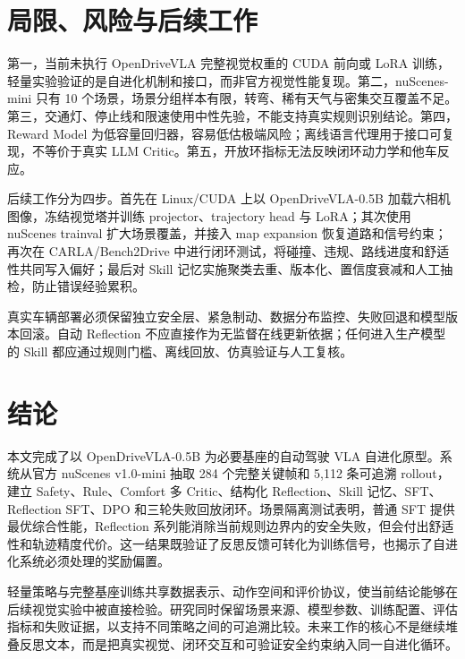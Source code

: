 \documentclass[UTF8,a4paper,12pt,fontset=fandol]{ctexart}
\begin{document}
\section{局限、风险与后续工作}
第一，当前未执行 OpenDriveVLA 完整视觉权重的 CUDA 前向或 LoRA 训练，轻量实验验证的是自进化机制和接口，而非官方视觉性能复现。第二，nuScenes-mini 只有 10 个场景，场景分组样本有限，转弯、稀有天气与密集交互覆盖不足。第三，交通灯、停止线和限速使用中性先验，不能支持真实规则识别结论。第四，Reward Model 为低容量回归器，容易低估极端风险；离线语言代理用于接口可复现，不等价于真实 LLM Critic。第五，开放环指标无法反映闭环动力学和他车反应。

后续工作分为四步。首先在 Linux/CUDA 上以 OpenDriveVLA-0.5B 加载六相机图像，冻结视觉塔并训练 projector、trajectory head 与 LoRA；其次使用 nuScenes trainval 扩大场景覆盖，并接入 map expansion 恢复道路和信号约束；再次在 CARLA/Bench2Drive 中进行闭环测试，将碰撞、违规、路线进度和舒适性共同写入偏好；最后对 Skill 记忆实施聚类去重、版本化、置信度衰减和人工抽检，防止错误经验累积。

真实车辆部署必须保留独立安全层、紧急制动、数据分布监控、失败回退和模型版本回滚。自动 Reflection 不应直接作为无监督在线更新依据；任何进入生产模型的 Skill 都应通过规则门槛、离线回放、仿真验证与人工复核。

\section{结论}
本文完成了以 OpenDriveVLA-0.5B 为必要基座的自动驾驶 VLA 自进化原型。系统从官方 nuScenes v1.0-mini 抽取 284 个完整关键帧和 5,112 条可追溯 rollout，建立 Safety、Rule、Comfort 多 Critic、结构化 Reflection、Skill 记忆、SFT、Reflection SFT、DPO 和三轮失败回放闭环。场景隔离测试表明，普通 SFT 提供最优综合性能，Reflection 系列能消除当前规则边界内的安全失败，但会付出舒适性和轨迹精度代价。这一结果既验证了反思反馈可转化为训练信号，也揭示了自进化系统必须处理的奖励偏置。

轻量策略与完整基座训练共享数据表示、动作空间和评价协议，使当前结论能够在后续视觉实验中被直接检验。研究同时保留场景来源、模型参数、训练配置、评估指标和失败证据，以支持不同策略之间的可追溯比较。未来工作的核心不是继续堆叠反思文本，而是把真实视觉、闭环交互和可验证安全约束纳入同一自进化循环。
\end{document}
